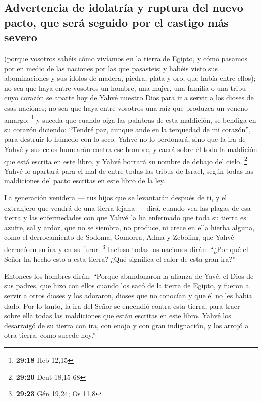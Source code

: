 \begin{paracol}{2}
\hypertarget{advertencia-de-idolatruxeda-y-ruptura-del-nuevo-pacto-que-seruxe1-seguido-por-el-castigo-muxe1s-severo}{%
\subsection{Advertencia de idolatría y ruptura del nuevo pacto, que será
seguido por el castigo más
severo}\label{advertencia-de-idolatruxeda-y-ruptura-del-nuevo-pacto-que-seruxe1-seguido-por-el-castigo-muxe1s-severo}}

 (porque vosotros sabéis cómo vivíamos en la tierra de
Egipto, y cómo pasamos por en medio de las naciones por las que
pasasteis;  y habéis visto sus abominaciones y sus ídolos
de madera, piedra, plata y oro, que había entre ellos); 
no sea que haya entre vosotros un hombre, una mujer, una familia o una
tribu cuyo corazón se aparte hoy de Yahvé nuestro Dios para ir a servir
a los dioses de esas naciones; no sea que haya entre vosotros una raíz
que produzca un veneno amargo; \footnote{\textbf{29:18} Heb 12,15}
 y suceda que cuando oiga las palabras de esta maldición,
se bendiga en su corazón diciendo: ``Tendré paz, aunque ande en la
terquedad de mi corazón'', para destruir lo húmedo con lo seco.
 Yahvé no lo perdonará, sino que la ira de Yahvé y sus
celos humearán contra ese hombre, y caerá sobre él toda la maldición que
está escrita en este libro, y Yahvé borrará su nombre de debajo del
cielo. \footnote{\textbf{29:20} Deut 18,15-68}  Yahvé lo
apartará para el mal de entre todas las tribus de Israel, según todas
las maldiciones del pacto escritas en este libro de la ley.

 La generación venidera --- tus hijos que se levantarán
después de ti, y el extranjero que vendrá de una tierra lejana --- dirá,
cuando vea las plagas de esa tierra y las enfermedades con que Yahvé la
ha enfermado  que toda su tierra es azufre, sal y ardor,
que no se siembra, no produce, ni crece en ella hierba alguna, como el
derrocamiento de Sodoma, Gomorra, Adma y Zeboiim, que Yahvé derrocó en
su ira y en su furor. \footnote{\textbf{29:23} Gén 19,24; Os 11,8}
 Incluso todas las naciones dirán: ``¿Por qué el Señor ha
hecho esto a esta tierra? ¿Qué significa el calor de esta gran ira?''

 Entonces los hombres dirán: ``Porque abandonaron la
alianza de Yavé, el Dios de sus padres, que hizo con ellos cuando los
sacó de la tierra de Egipto,  y fueron a servir a otros
dioses y los adoraron, dioses que no conocían y que él no les había
dado.  Por lo tanto, la ira del Señor se encendió contra
esta tierra, para traer sobre ella todas las maldiciones que están
escritas en este libro.  Yahvé los desarraigó de su
tierra con ira, con enojo y con gran indignación, y los arrojó a otra
tierra, como sucede hoy.''


\end{paracol}
